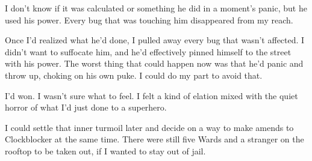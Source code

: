 I don't know if it was calculated or something he did in a moment's panic, but he used his power.  Every bug that was touching him disappeared from my reach.



Once I'd realized what he'd done, I pulled away every bug that wasn't affected.  I didn't want to suffocate him, and he'd effectively pinned himself to the street with his power.  The worst thing that could happen now was that he'd panic and throw up, choking on his own puke.  I could do my part to avoid that.



I'd won.  I wasn't sure what to feel.  I felt a kind of elation mixed with the quiet horror of what I'd just done to a superhero.



I could settle that inner turmoil later and decide on a way to make amends to Clockblocker at the same time.  There were still five Wards and a stranger on the rooftop to be taken out, if I wanted to stay out of jail.

















